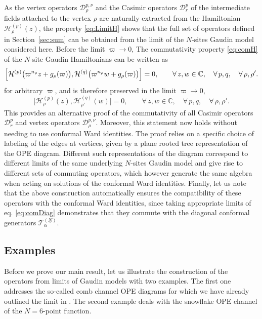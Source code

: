 \documentclass{article}
\def\Hc{\mathcal{H}}
\begin{document}
As the vertex operators $\mathcal{D}_\rho^{p,\nu}$ and the Casimir operators $\mathcal{D}_r^p$ of the 
intermediate fields attached to the vertex $\rho$ are naturally extracted from the Hamiltonian 
$\Hc^{(p)}_\rho(z)$, the property \eqref{eq:LimitH} shows that the full set of operators defined in 
Section~\ref{sec:sum} can be obtained from the limit of the $N$-sites Gaudin model considered here. Before the limit $\varpi\to 0$, The 
commutativity property \eqref{eq:comH} of the $N$-site Gaudin Hamiltonians can be written as
\begin{equation}
\Bigl[ \Hc^{(p)}\bigl(\varpi^{n_\rho}z + g_\rho(\varpi) \bigr), \Hc^{(q)}\bigl(\varpi^{n_\rho}w + 
g_\rho(\varpi) \bigr) \Bigr] = 0, \qquad \forall\, z,w\in\mathbb{C}, \quad \forall\,p,q, \quad \forall\,\rho,\rho'.
\end{equation}
for arbitrary $\varpi$, and is therefore preserved in the limit $\varpi\to 0$,
\begin{equation}
\bigl[ \Hc^{(p)}_\rho(z), \Hc^{(q)}_{\rho'}(w) \bigr] = 0, \qquad 
\forall\, z,w\in\mathbb{C}, \quad \forall\,p,q, \quad \forall\,\rho,\rho'.
\end{equation}
This provides an alternative proof of the commutativity of all Casimir operators $\mathcal{D}_r^p$ 
and vertex operators $\mathcal{D}_\rho^{p,\nu}$. Moreover, this statement now holds without needing to use conformal Ward identities. The proof relies on a specific choice of labeling of the edges at vertices, given by a plane rooted tree representation of the OPE 
diagram. Different such representations of the diagram correspond to different limits of the same 
underlying $N$-sites Gaudin model and give rise to different sets of commuting operators, which 
however generate the same algebra when acting on solutions of the conformal Ward identities. Finally, let
us note that the above construction automatically ensures the compatibility of these operators with the conformal Ward identities, since taking appropriate limits of eq.
\eqref{eq:comDiag} demonstrates that they commute with the diagonal conformal generators 
$\mathcal{T}_\alpha^{(\underline{N})}$.

\subsection{Examples}

Before we prove our main result, let us illustrate the construction of the operators from limits of Gaudin models with 
two examples. The first one addresses the so-called comb channel OPE diagrams for which we 
have already outlined the limit in \cite{Buric:2020dyz}. The second example deals with
the snowflake OPE channel of the $N=6$-point function.  
\end{document}
